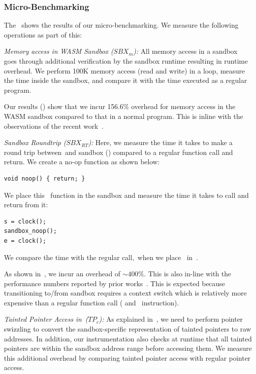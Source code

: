\subsubsection{Micro-Benchmarking}
The~ shows the results of our micro-benchmarking.
We measure the following operations as part of this:

\noindent\emph{Memory access in WASM Sandbox ($SBX_{m}$):} 
All memory access in a sandbox goes through additional verification by the sandbox runtime resulting in runtime overhead.
We perform 100K memory access (read and write) in a loop, measure the time inside the sandbox, and compare it with the time executed as a regular program.

Our results () show that we incur 156.6\% overhead for memory access in the WASM sandbox compared to that in a normal program.
This is inline with the observations of the recent work~\cite{jangda2019not}.

\noindent\emph{Sandbox Roundtrip ($SBX_{RT}$):}
Here, we measure the time it takes to make a round trip between~\cregion and sandbox (\ucregion) compared to a regular function call and return.
We create a no-op function as shown below:
\begin{verbatim}
void noop() { return; }
\end{verbatim}
We place this~ function in the sandbox and measure the time it takes to call and return from it:
\begin{verbatim}
s = clock();
sandbox_noop();
e = clock();
\end{verbatim}
We compare the time with the regular call,~\ie when we place~ in~\cregion.

As shown in~, we incur an overhead of $\sim 400\%$. This is also in-line with the performance numbers reported by prior works~\cite{jangda2019not, rlbox-paper}.
This is expected because transitioning to/from sandbox requires a context switch which is relatively more expensive than a regular function call (\ie{} and~ instruction).

\noindent\emph{Tainted Pointer Access in~\cregion ($TP_{c}$):}
As explained in~, we need to perform pointer swizzling to convert the sandbox-specific representation of tainted pointers to raw addresses.
In addition, our instrumentation also checks at runtime that all tainted pointers are within the sandbox address range before accessing them.
We measure this additional overhead by comparing tainted pointer access with regular pointer access.

